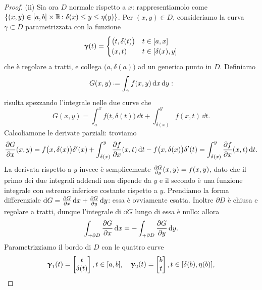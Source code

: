 \begin{proof}
	(ii) Sia ora $D$ normale rispetto a $x$: rappresentiamolo come $\{(x,y)\in[a,b]\times\mathbb{R}\colon\delta(x)\leq y\leq\eta(y)\}$.
	Per $(x,y)\in D$, consideriamo la curva $\gamma\subset D$ parametrizzata con la funzione
	\begin{equation*}
		\bm{\upgamma}(t)=
		\begin{cases}
			\big(t,\delta(t)\big) &t\in[a,x]\\
			(x,t) &t\in[\delta(x),y]
		\end{cases}
	\end{equation*}
	che è regolare a tratti, e collega $\big(a,\delta(a)\big)$ ad un generico punto in $D$.
	Definiamo
	\begin{equation*}
		G(x,y)\defeq\int_{\gamma}f(x,y)\,\dd x\,\dd y:
	\end{equation*}
	risulta spezzando l'integrale nelle due curve che
	\begin{equation}
		G(x,y)=\int_a^xf\big(t,\delta(t)\big)\,\dd t+\int_{\delta(x)}^yf(x,t)\,\dd t.
	\end{equation}
	Calcoliamone le derivate parziali: troviamo
	\begin{equation}
		\frac{\partial {G}}{\partial {x}}(x,y)=f\big(x,\delta(x)\big)\delta'(x)+\int_{\delta(x)}^y\frac{\partial {f}}{\partial {x}}(x,t)\,\textup{d} t-f\big(x,\delta(x)\big)\delta'(t)=\int_{\delta(x)}^y\frac{\partial {f}}{\partial {x}}(x,t)\,\textup{d} t.
	\end{equation}
	La derivata rispetto a $y$ invece è semplicemente $\frac{\partial {G}}{\partial {y}}(x,y)=f(x,y)$, dato che il primo dei due integrali addendi non dipende da $y$ e il secondo è una funzione integrale con estremo inferiore costante rispetto a $y$.
	Prendiamo la forma differenziale $\textup{d} G=\frac{\partial {G}}{\partial {x}}\,\textup{d} x+\frac{\partial {G}}{\partial {y}}\,\textup{d} y$: essa è ovviamente esatta.
	Inoltre $\partial D$ è chiusa e regolare a tratti, dunque l'integrale di $\dd G$ lungo di essa è nullo: allora
	\begin{equation}
		\int_{+\partial D}\frac{\partial {G}}{\partial {x}}\,\textup{d} x=-\int_{+\partial D}\frac{\partial {G}}{\partial {y}}\,\textup{d} y.
		\label{eq:dim-gauss-green-forma-esatta}
	\end{equation}
	Parametrizziamo il bordo di $D$ con le quattro curve
	\begin{gather*}
		\vgamma_1(t)=
		\begin{bmatrix}
			t\\\delta(t)
		\end{bmatrix}, t\in[a,b],\quad
		\vgamma_2(t)=
		\begin{bmatrix}
			b\\t
		\end{bmatrix}, t\in[\delta(b),\eta(b)],\\

\end{gather*}
\end{proof}
